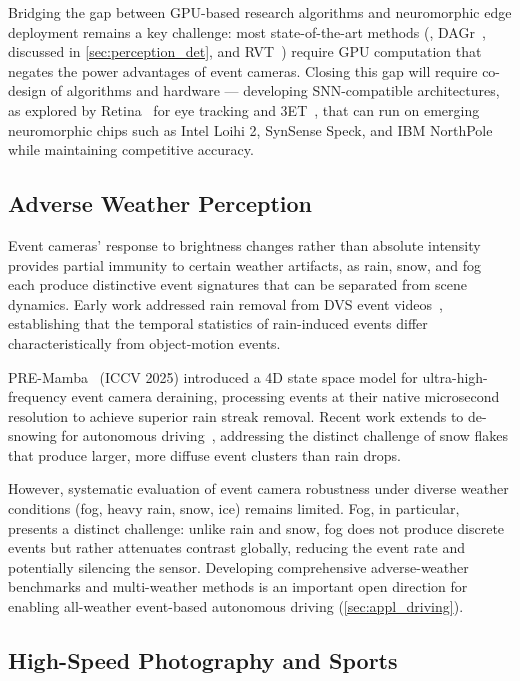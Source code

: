 Bridging the gap between GPU-based research algorithms and neuromorphic edge deployment remains a key challenge: most state-of-the-art methods (\eg, DAGr~\cite{gehrig2024dagr}, discussed in \cref{sec:perception_det}, and RVT~\cite{gehrig2023rvt}) require GPU computation that negates the power advantages of event cameras. Closing this gap will require co-design of algorithms and hardware --- developing SNN-compatible architectures, as explored by Retina~\cite{li2024retina} for eye tracking and 3ET~\cite{chen20233et}, that can run on emerging neuromorphic chips such as Intel Loihi 2, SynSense Speck, and IBM NorthPole while maintaining competitive accuracy.


\subsection{Adverse Weather Perception}
\label{sec:appl_weather}

Event cameras' response to brightness changes rather than absolute intensity provides partial immunity to certain weather artifacts, as rain, snow, and fog each produce distinctive event signatures that can be separated from scene dynamics. Early work addressed rain removal from DVS event videos~\cite{jiang2022rainremoval}, establishing that the temporal statistics of rain-induced events differ characteristically from object-motion events.

PRE-Mamba~\cite{li2025premamba} (ICCV 2025) introduced a 4D state space model for ultra-high-frequency event camera deraining, processing events at their native microsecond resolution to achieve superior rain streak removal. Recent work extends to de-snowing for autonomous driving~\cite{zhang2025desnowing}, addressing the distinct challenge of snow flakes that produce larger, more diffuse event clusters than rain drops.

However, systematic evaluation of event camera robustness under diverse weather conditions (fog, heavy rain, snow, ice) remains limited. Fog, in particular, presents a distinct challenge: unlike rain and snow, fog does not produce discrete events but rather attenuates contrast globally, reducing the event rate and potentially silencing the sensor. Developing comprehensive adverse-weather benchmarks and multi-weather methods is an important open direction for enabling all-weather event-based autonomous driving (\cref{sec:appl_driving}).


\subsection{High-Speed Photography and Sports}
\label{sec:appl_sports}

